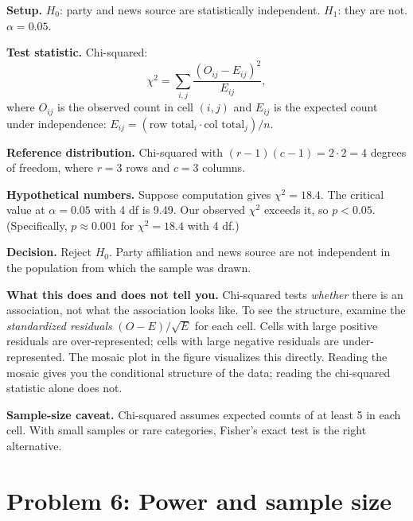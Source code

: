 \documentclass[
  letterpaper,
  11pt,
  twoside,
  openany]{scrbook}
\begin{document}
\begin{tcolorbox}[enhanced jigsaw, arc=.35mm, bottomrule=.15mm, bottomtitle=1mm, breakable, colback=white, colbacktitle=quarto-callout-note-color!10!white, colframe=quarto-callout-note-color-frame, coltitle=black, left=2mm, leftrule=.75mm, opacityback=0, opacitybacktitle=0.6, rightrule=.15mm, title=\textcolor{quarto-callout-note-color}{\faInfo}\hspace{0.5em}{Solution to Problem 5}, titlerule=0mm, toprule=.15mm, toptitle=1mm]

\textbf{Setup.} \(H_0\): party and news source are statistically
independent. \(H_1\): they are not. \(\alpha = 0.05\).

\textbf{Test statistic.} Chi-squared: \[
\chi^2 = \sum_{i,j} \frac{(O_{ij} - E_{ij})^2}{E_{ij}},
\] where \(O_{ij}\) is the observed count in cell \((i, j)\) and
\(E_{ij}\) is the expected count under independence:
\(E_{ij} = (\text{row total}_i \cdot \text{col total}_j) / n\).

\textbf{Reference distribution.} Chi-squared with
\((r - 1)(c - 1) = 2 \cdot 2 = 4\) degrees of freedom, where \(r = 3\)
rows and \(c = 3\) columns.

\textbf{Hypothetical numbers.} Suppose computation gives
\(\chi^2 = 18.4\). The critical value at \(\alpha = 0.05\) with 4 df is
9.49. Our observed \(\chi^2\) exceeds it, so \(p < 0.05\).
(Specifically, \(p \approx 0.001\) for \(\chi^2 = 18.4\) with 4 df.)

\textbf{Decision.} Reject \(H_0\). Party affiliation and news source are
not independent in the population from which the sample was drawn.

\textbf{What this does and does not tell you.} Chi-squared tests
\emph{whether} there is an association, not what the association looks
like. To see the structure, examine the \emph{standardized residuals}
\((O - E)/\sqrt{E}\) for each cell. Cells with large positive residuals
are over-represented; cells with large negative residuals are
under-represented. The mosaic plot in the figure visualizes this
directly. Reading the mosaic gives you the conditional structure of the
data; reading the chi-squared statistic alone does not.

\textbf{Sample-size caveat.} Chi-squared assumes expected counts of at
least 5 in each cell. With small samples or rare categories, Fisher's
exact test is the right alternative.

\end{tcolorbox}

\section{Problem 6: Power and sample
size}\label{problem-6-power-and-sample-size}
\end{document}
